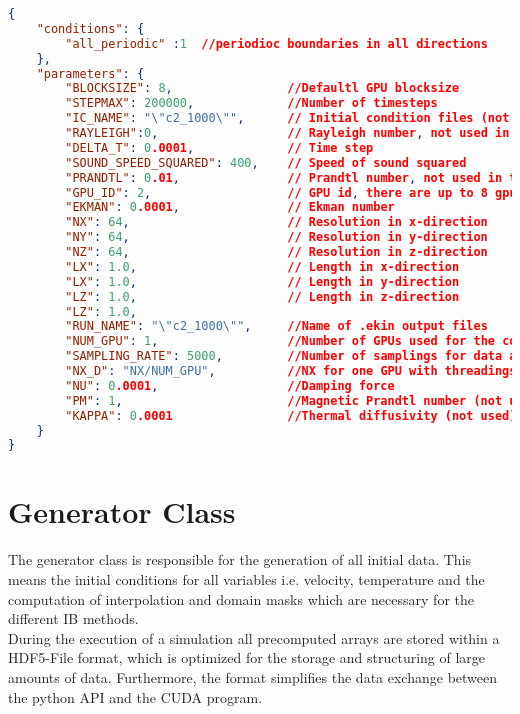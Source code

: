 \begin{minipage}{\linewidth}
\begin{lstlisting}[language=json, caption={'Example of a "parameter.json" file.}, label={lst_json} ]
{
    "conditions": {
        "all_periodic" :1  //periodioc boundaries in all directions
    },
    "parameters": {
        "BLOCKSIZE": 8,                //Defaultl GPU blocksize
        "STEPMAX": 200000,             //Number of timesteps
        "IC_NAME": "\"c2_1000\"",      // Initial condition files (not in use anymore)
        "RAYLEIGH":0,                  // Rayleigh number, not used in this thesis
        "DELTA_T": 0.0001,             // Time step
        "SOUND_SPEED_SQUARED": 400,    // Speed of sound squared
        "PRANDTL": 0.01,               // Prandtl number, not used in this thesis
        "GPU_ID": 2,                   // GPU id, there are up to 8 gpus in one system
        "EKMAN": 0.0001,               // Ekman number
        "NX": 64,                      // Resolution in x-direction
        "NY": 64,                      // Resolution in y-direction
        "NZ": 64,                      // Resolution in z-direction
        "LX": 1.0,                     // Length in x-direction
        "LX": 1.0,                     // Length in y-direction
        "LZ": 1.0,                     // Length in z-direction
        "LZ": 1.0,
        "RUN_NAME": "\"c2_1000\"",     //Name of .ekin output files
        "NUM_GPU": 1,                  //Number of GPUs used for the computation
        "SAMPLING_RATE": 5000,         //Number of samplings for data analysis
        "NX_D": "NX/NUM_GPU",          //NX for one GPU with threadings
        "NU": 0.0001,                  //Damping force
        "PM": 1,                       //Magnetic Prandtl number (not used)
        "KAPPA": 0.0001                //Thermal diffusivity (not used)
    }
}
\end{lstlisting}
\end{minipage}

\section{Generator Class}

The generator class is responsible for the generation of all initial data.
This means the initial conditions for all variables i.e. velocity, temperature
and the computation of interpolation and domain masks which are necessary for the different
IB methods.\\
During the execution of a simulation all precomputed arrays are stored within a
HDF5-File format, which is optimized for the storage and structuring of large amounts of data.
Furthermore, the format simplifies the data exchange between the python API and the CUDA program.

